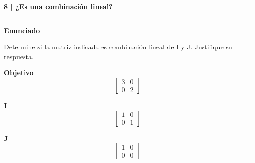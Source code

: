 \documentclass[11pt,a4paper,landscape]{article}
\newcommand{\titulo}[1]{{\LARGE\bfseries #1}\par\smallskip\hrule\medskip}
\begin{document}
\newpage{}\hypertarget{1.2-8}{}
\titulo{8 | ¿Es una combinación lineal?}
\textbf{Enunciado}\par Determine si la matriz indicada es combinación lineal de I y J. Justifique su respuesta.
\par\smallskip \begin{minipage}[t]{.47\linewidth}\centering \textbf{Objetivo}\[\begin{bmatrix}3 & 0\\0 & 2\end{bmatrix}\]\end{minipage}\hfill\begin{minipage}[t]{.47\linewidth}\centering \textbf{I}\[\begin{bmatrix}1 & 0\\0 & 1\end{bmatrix}\]\end{minipage}\par\smallskip
\par\smallskip \begin{minipage}[t]{.47\linewidth}\centering \textbf{J}\[\begin{bmatrix}1 & 0\\0 & 0\end{bmatrix}\]\end{minipage}\par\smallskip
\end{document}
